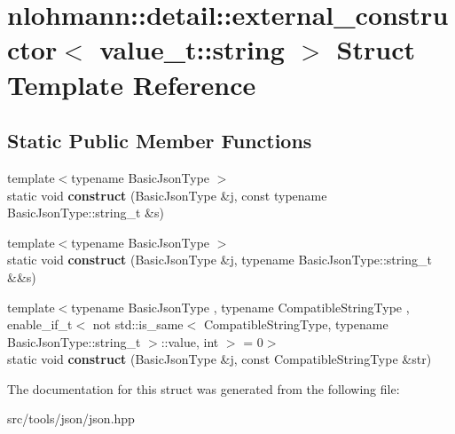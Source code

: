 \hypertarget{structnlohmann_1_1detail_1_1external__constructor_3_01value__t_1_1string_01_4}{}\section{nlohmann\+:\+:detail\+:\+:external\+\_\+constructor$<$ value\+\_\+t\+:\+:string $>$ Struct Template Reference}
\label{structnlohmann_1_1detail_1_1external__constructor_3_01value__t_1_1string_01_4}
\subsection*{Static Public Member Functions}
\begin{DoxyCompactItemize}
\item 
\mbox{\label{structnlohmann_1_1detail_1_1external__constructor_3_01value__t_1_1string_01_4_ad88d0b4b7ea01ea20e12cc1b82fe0d92}} 
{\footnotesize template$<$typename Basic\+Json\+Type $>$ }\\static void {\bfseries construct} (Basic\+Json\+Type \&j, const typename Basic\+Json\+Type\+::string\+\_\+t \&s)
\item 
\mbox{\label{structnlohmann_1_1detail_1_1external__constructor_3_01value__t_1_1string_01_4_a74f56b9ca1d4e8db9751353d76668322}} 
{\footnotesize template$<$typename Basic\+Json\+Type $>$ }\\static void {\bfseries construct} (Basic\+Json\+Type \&j, typename Basic\+Json\+Type\+::string\+\_\+t \&\&s)
\item 
\mbox{\label{structnlohmann_1_1detail_1_1external__constructor_3_01value__t_1_1string_01_4_a8822d43f0e20c5a28be329f9ca7de6c4}} 
{\footnotesize template$<$typename Basic\+Json\+Type , typename Compatible\+String\+Type , enable\+\_\+if\+\_\+t$<$ not std\+::is\+\_\+same$<$ Compatible\+String\+Type, typename Basic\+Json\+Type\+::string\+\_\+t $>$\+::value, int $>$  = 0$>$ }\\static void {\bfseries construct} (Basic\+Json\+Type \&j, const Compatible\+String\+Type \&str)
\end{DoxyCompactItemize}


The documentation for this struct was generated from the following file\+:\begin{DoxyCompactItemize}
\item 
src/tools/json/json.\+hpp\end{DoxyCompactItemize}
